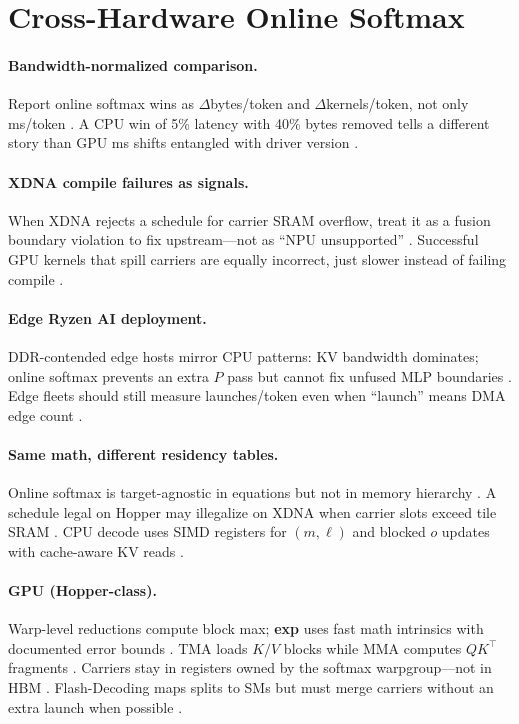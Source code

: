 \section{Cross-Hardware Online Softmax}
\label{sec:ch10_cross_hardware}
\paragraph{Bandwidth-normalized comparison.} Report online softmax wins as $\Delta$bytes/token and $\Delta$kernels/token, not only ms/token \citep{memoryfloor2026,taxbreak2026}. A CPU win of 5\% latency with 40\% bytes removed tells a different story than GPU ms shifts entangled with driver version \citep{patel2025llminference,dlbook}.

\paragraph{XDNA compile failures as signals.} When XDNA rejects a schedule for carrier SRAM overflow, treat it as a fusion boundary violation to fix upstream---not as ``NPU unsupported'' \citep{amd2024aie,yirage2026}. Successful GPU kernels that spill carriers are equally incorrect, just slower instead of failing compile \citep{memoryfloor2026,chen2020compilerbasedhardw}.

\paragraph{Edge Ryzen AI deployment.} DDR-contended edge hosts mirror CPU patterns: KV bandwidth dominates; online softmax prevents an extra $P$ pass but cannot fix unfused MLP boundaries \citep{amd2024xdna,patel2025llminference}. Edge fleets should still measure launches/token even when ``launch'' means DMA edge count \citep{amd2024aie,taxbreak2026}.


\paragraph{Same math, different residency tables.} Online softmax is target-agnostic in equations but not in memory hierarchy \citep{amd2024xdna,nvidia2022hopper,dlbook}. A schedule legal on Hopper may illegalize on XDNA when carrier slots exceed tile SRAM \citep{amd2024aie,yirage2026}. CPU decode uses SIMD registers for $(m,\ell)$ and blocked $o$ updates with cache-aware KV reads \citep{dlbook,patel2025llminference}.

\paragraph{GPU (Hopper-class).} Warp-level reductions compute block max; \textbf{exp} uses fast math intrinsics with documented error bounds \citep{nvidia2022hopper,semianalysis2024tma}. TMA loads $K/V$ blocks while MMA computes $QK^\top$ fragments \citep{semianalysis2024tma}. Carriers stay in registers owned by the softmax warpgroup---not in HBM \citep{memoryfloor2026,dao2022flashattention}. Flash-Decoding maps splits to SMs but must merge carriers without an extra launch when possible \citep{dao2023flashdecoding,taxbreak2026}.

